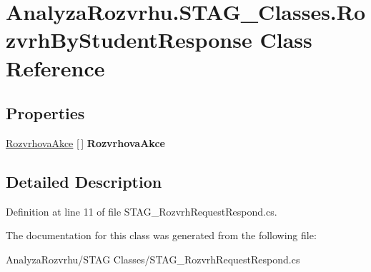 \hypertarget{class_analyza_rozvrhu_1_1_s_t_a_g___classes_1_1_rozvrh_by_student_response}{}\section{Analyza\+Rozvrhu.\+S\+T\+A\+G\+\_\+\+Classes.\+Rozvrh\+By\+Student\+Response Class Reference}
\label{class_analyza_rozvrhu_1_1_s_t_a_g___classes_1_1_rozvrh_by_student_response}
\subsection*{Properties}
\begin{DoxyCompactItemize}
\item 
\mbox{\label{class_analyza_rozvrhu_1_1_s_t_a_g___classes_1_1_rozvrh_by_student_response_a0d1845e7de9ca64b54450547ca2435cb}} 
\hyperlink{class_analyza_rozvrhu_1_1_s_t_a_g___classes_1_1_rozvrhova_akce}{Rozvrhova\+Akce} \mbox{[}$\,$\mbox{]} {\bfseries Rozvrhova\+Akce}
\end{DoxyCompactItemize}


\subsection{Detailed Description}


Definition at line 11 of file S\+T\+A\+G\+\_\+\+Rozvrh\+Request\+Respond.\+cs.



The documentation for this class was generated from the following file\+:\begin{DoxyCompactItemize}
\item 
Analyza\+Rozvrhu/\+S\+T\+A\+G Classes/S\+T\+A\+G\+\_\+\+Rozvrh\+Request\+Respond.\+cs\end{DoxyCompactItemize}
